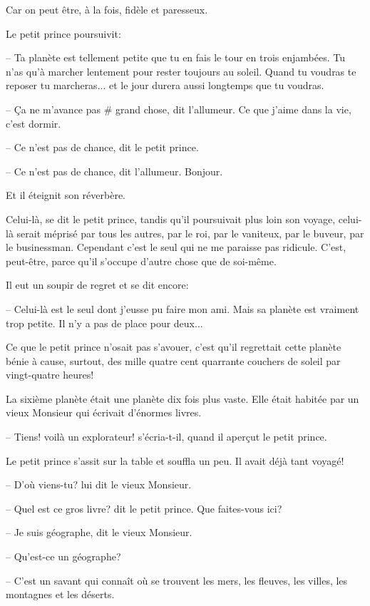 \documentclass[a4paper]{report}
\begin{document}
Car on peut être, à la fois, fidèle et paresseux.

Le petit prince poursuivit:

-- Ta planète est tellement petite que tu en fais le tour en trois enjambées. Tu n'as qu'à marcher lentement pour rester toujours au soleil. Quand tu voudras te reposer tu marcheras... et le jour durera aussi longtemps que tu voudras.

-- Ça ne m'avance pas \# grand chose, dit l'allumeur. Ce que j'aime dans la vie, c'est dormir.

-- Ce n'est pas de chance, dit le petit prince.

-- Ce n'est pas de chance, dit l'allumeur. Bonjour.

Et il éteignit son réverbère.

Celui-là, se dit le petit prince, tandis qu'il poursuivait plus loin son voyage, celui-là serait méprisé par tous les autres, par le roi, par le vaniteux, par le buveur, par le businessman. Cependant c'est le seul qui ne me paraisse pas ridicule. C'est, peut-être, parce qu'il s'occupe d'autre chose que de soi-même.

Il eut un soupir de regret et se dit encore:

-- Celui-là est le seul dont j'eusse pu faire mon ami. Mais sa planète est vraiment trop petite. Il n'y a pas de place pour deux...

Ce que le petit prince n'osait pas s'avouer, c'est qu'il regrettait cette planète bénie à cause, surtout, des mille quatre cent quarrante couchers de soleil par vingt-quatre heures!
\parachapter{} %

La sixième planète était une planète dix fois plus vaste. Elle était habitée par un vieux Monsieur qui écrivait d'énormes livres.

-- Tiens! voilà un explorateur! s'écria-t-il, quand il aperçut le petit prince.

Le petit prince s'assit sur la table et souffla un peu. Il avait déjà tant voyagé!


-- D'où viens-tu? lui dit le vieux Monsieur.

-- Quel est ce gros livre? dit le petit prince. Que faites-vous ici?

-- Je suis géographe, dit le vieux Monsieur.

-- Qu'est-ce un géographe?

-- C'est un savant qui connaît où se trouvent les mers, les fleuves, les villes, les montagnes et les déserts.
\end{document}
